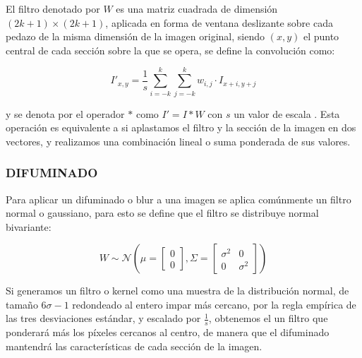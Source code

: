         El filtro denotado por $W$ es una matriz cuadrada de dimensión $(2k+1) \times (2k+1)$, aplicada en forma de ventana deslizante sobre cada pedazo de la misma dimensión de la imagen original, siendo $(x, y)$ el punto central de cada sección sobre la que se opera, se define la convolución como:
        
        \begin{equation}
            I'_{x,y} = \frac{1}{s} \sum_{i=-k}^{k} \sum_{j=-k}^{k} w_{i, j}\cdot I_{x+i, y+j}
        \end{equation}
        
        y se denota por el operador $*$ como $I' = I*W$ con $s$ un valor de escala \citep{10.5555/2584519}. Esta operación es equivalente a si aplastamos el filtro y la sección de la imagen en dos vectores, y realizamos una combinación lineal o suma ponderada de sus valores.
        \subsubsection{DIFUMINADO}
        Para aplicar un difuminado o blur a una imagen se aplica comúnmente un filtro normal o gaussiano, para esto se define que el filtro se distribuye normal bivariante:
        
        \begin{equation}
            W \sim \mathcal{N}\left(\mu=\begin{bmatrix}
                                    0\\
                                    0
                                    \end{bmatrix},
                                    \Sigma=
                                    \begin{bmatrix}
                                    \sigma^2 & 0\\
                                    0 & \sigma^2
                                    \end{bmatrix}\right)
        \end{equation}
        
        Si generamos un filtro o kernel como una muestra de la distribución normal, de tamaño $6\sigma-1$ redondeado al entero impar más cercano, por la regla empírica de las tres desviaciones estándar, y escalado por $\frac{1}{s}$, obtenemos el un filtro que ponderará más los píxeles cercanos al centro, de manera que el difuminado mantendrá las características de cada sección de la imagen.
        

